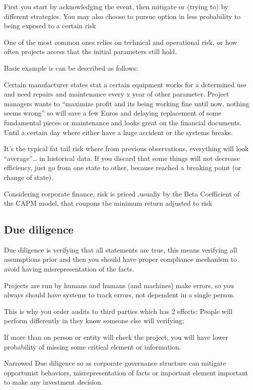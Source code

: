 \documentclass[]{book}
\theoremstyle{definition}
\theoremstyle{definition}
\theoremstyle{definition}
\theoremstyle{remark}
\begin{document}
First you start by acknowledging the event, then mitigate or (trying to)
by different strategies. You may also choose to pursue option in less
probability to being exposed to a certain risk

One of the most common ones relies on technical and operational risk, or
how often projects access that the initial parameters still hold.

Basic example is can be described as follows:

Certain manufacturer states stat a certain equipment works for a
determined use and need repairs and maintenance every x year of other
parameter. Project managers wants to ``maximize profit and its being
working fine until now, nothing seems wrong'' so will save a few Euros
and delaying replacement of some fundamental pieces or maintenance and
looks great on the financial documents. Until a certain day where either
have a huge accident or the systems breaks.

It's the typical fat tail risk where from previous observations,
everything will look ``average''\ldots{} in historical data. If you
discard that some things will not decrease efficiency, just go from one
state to other, because reached a breaking point (or change of state).

Considering corporate finance, risk is priced ,usually by the Beta
Coefficient of the CAPM model, that coupons the minimum return adjusted
to risk

\subsection{Due diligence}\label{due-diligence}

Due diligence is verifying that all statements are true, this means
verifying all assumptions prior and then you should have proper
compliance mechanism to avoid having misrepresentation of the facts.

Projects are run by humans and humans (and machines) make errors, so you
always should have systems to track errors, not dependent in a single
person.

This is why you order audits to third parties which has 2 effects:
People will perform differently in they know someone else will
verifying;

If more than on person or entity will check the project, you will have
lower probability of missing some critical element or information.

Narrowed Due diligence so as corporate governance structure can mitigate
opportunist behaviors, misrepresentation of facts or important element
important to make any investment decision.
\end{document}
